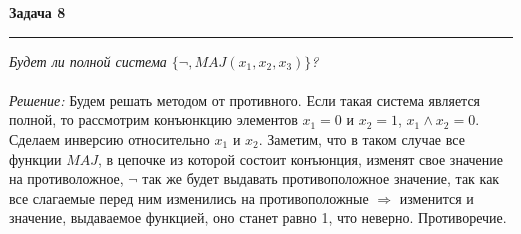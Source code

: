 \documentclass[12pt,a4paper]{scrartcl}
\begin{document}
\textbf{Задача 8} 
\medskip\hrule\medskip
\textsl{
Будет ли полной система $\{\neg, MAJ(x_1, x_2, x_3)\}$?} \\ \\
\textit{Решение:} Будем решать методом от противного. Если такая система является полной, то рассмотрим конъюнкцию элементов $x_1 = 0$ и $x_2 = 1$, $x_1 \wedge x_2 = 0$. Сделаем инверсию относительно $x_1$ и $x_2$. Заметим, что в таком случае все функции $MAJ$, в цепочке из которой состоит конъюнция,  изменят свое значение на противоложное, $\neg$ так же будет выдавать противоположное значение, так как все слагаемые перед ним изменились на противоположные $\Rightarrow$ изменится и значение, выдаваемое функцией, оно станет равно 1, что неверно. Противоречие.   
\end{document}
